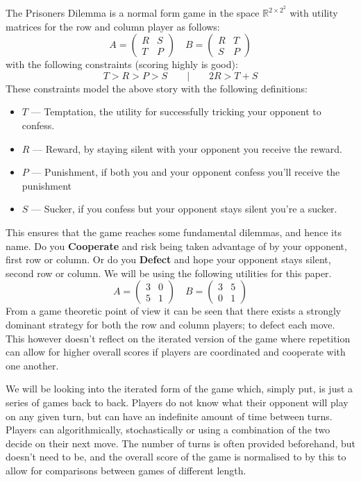 The Prisoners Dilemma is a normal form game in the space $\mathbb{R}^{{2\times 2}^2}$ with utility matrices for the row and column player as follows:
$$
    A=\begin{pmatrix}R & S\\ T & P\end{pmatrix}\quad
    B=\begin{pmatrix}R & T\\ S & P\end{pmatrix}
$$
with the following constraints (scoring highly is good):
$$T>R>P>S \qquad \vert \qquad 2R>T+S$$
These constraints model the above story with the following definitions:
\begin{itemize}
    \item $T$ --- Temptation, the utility for successfully tricking your opponent to confess.
    \item $R$ --- Reward, by staying silent with your opponent you receive the reward.
    \item $P$ --- Punishment, if both you and your opponent confess you'll receive the punishment
    \item $S$ --- Sucker, if you confess but your opponent stays silent you're a sucker.
\end{itemize}
This ensures that the game reaches some fundamental dilemmas, and hence its name.
Do you \textbf{Cooperate} and risk being taken advantage of by your opponent, first row or column.
Or do you \textbf{Defect} and hope your opponent stays silent, second row or column.
We will be using the following utilities for this paper.
$$
    A=\begin{pmatrix}3 & 0 \\ 5 & 1\end{pmatrix}\quad
    B=\begin{pmatrix}3 & 5 \\ 0 & 1\end{pmatrix}
$$    
From a game theoretic point of view it can be seen that there exists a strongly dominant strategy for both the row and column players; to defect each move.
This however doesn't reflect on the iterated version of the game where repetition can allow for higher overall scores if players are coordinated and cooperate with one another.

We will be looking into the iterated form of the game which, simply put, is just a series of games back to back. 
Players do not know what their opponent will play on any given turn, but can have an indefinite amount of time between turns.
Players can algorithmically, stochastically or using a combination of the two decide on their next move.
The number of turns is often provided beforehand, but doesn't need to be, and the overall score of the game is normalised to by this to allow for comparisons between games of different length.

